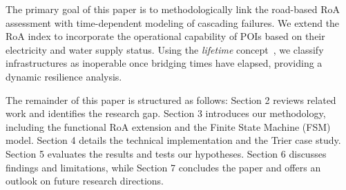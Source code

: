 \noindent
The primary goal of this paper is to methodologically link the road-based RoA assessment with time-dependent modeling of cascading failures.
We extend the RoA index to incorporate the operational capability of POIs based on their electricity and water supply status.
Using the \textit{lifetime} concept~\cite{lickert2024}, we classify infrastructures as inoperable once bridging times have elapsed, providing a dynamic resilience analysis.

The remainder of this paper is structured as follows: Section 2 reviews related work and identifies the research gap.
Section 3 introduces our methodology, including the functional RoA extension and the Finite State Machine (FSM) model.
Section 4 details the technical implementation and the Trier case study.
Section 5 evaluates the results and tests our hypotheses.
Section 6 discusses findings and limitations, while Section 7 concludes the paper and offers an outlook on future research directions.


